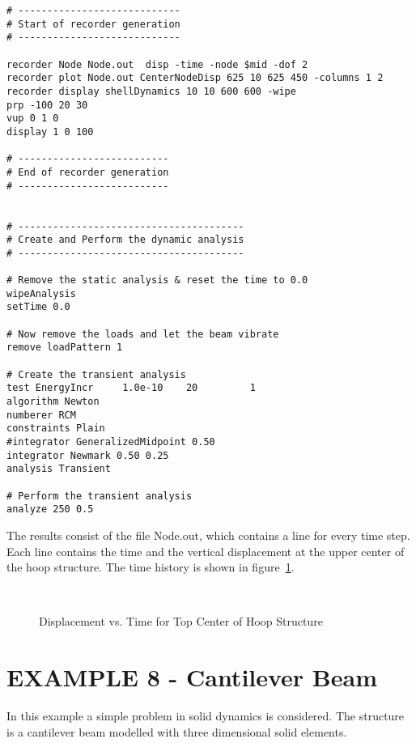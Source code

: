 \documentclass[12pt]{article}
\begin{document}
{\begin{verbatim}
# ----------------------------
# Start of recorder generation
# ----------------------------

recorder Node Node.out  disp -time -node $mid -dof 2
recorder plot Node.out CenterNodeDisp 625 10 625 450 -columns 1 2
recorder display shellDynamics 10 10 600 600 -wipe
prp -100 20 30
vup 0 1 0 
display 1 0 100

# --------------------------
# End of recorder generation
# --------------------------


# ---------------------------------------
# Create and Perform the dynamic analysis
# ---------------------------------------

# Remove the static analysis & reset the time to 0.0
wipeAnalysis
setTime 0.0

# Now remove the loads and let the beam vibrate
remove loadPattern 1

# Create the transient analysis
test EnergyIncr     1.0e-10    20         1
algorithm Newton
numberer RCM
constraints Plain 
#integrator GeneralizedMidpoint 0.50
integrator Newmark 0.50 0.25
analysis Transient

# Perform the transient analysis 
analyze 250 0.5

\end{verbatim}
}

\vspace{0.2in} 

The results consist of the file Node.out, which contains a line for
every time step. 
Each line contains the time and the vertical
displacement 
at the upper center of the hoop structure.
The time history is shown in
figure~\ref{shelldisp}. 
\begin{figure}[h]
\begin{center}
\leavevmode
\hbox{%
\epsfxsize=4.0in
\epsfysize=2.8in
}
\end{center}
\caption{Displacement vs. Time for Top Center of Hoop Structure}
\label{shelldisp}
\end{figure}



\clearpage
\section {EXAMPLE 8 - Cantilever Beam}

In this example a simple problem in solid dynamics is considered.
The structure is a cantilever beam modelled with three dimensional
solid elements.
\end{document}
